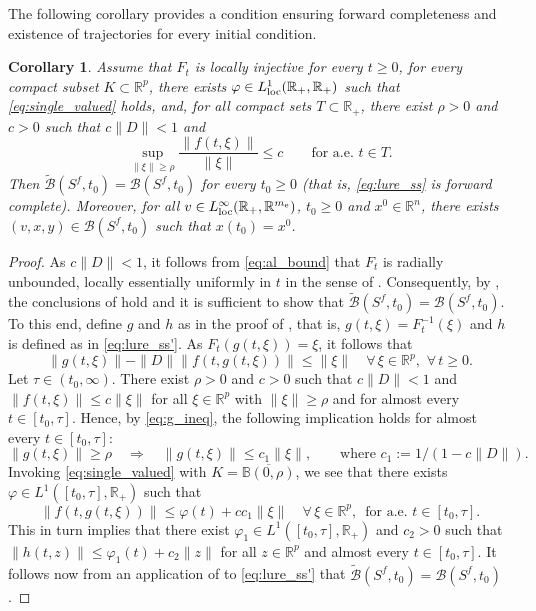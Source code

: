 \documentclass[a4paper,11pt]{article}
\newcommand{\B}{\mathbb B}
\newcommand{\R}{\mathbb R}
\newcommand{\sB}{{\mathcal B}}
\numberwithin{equation}{section}
\numberwithin{figure}{section}
\numberwithin{table}{section}
\newtheorem{corollary}[theorem]{Corollary}
\begin{document}
The following corollary provides a condition ensuring forward completeness and existence
of trajectories for every initial condition.
%
\begin{corollary}\label{cor:single_valued}
Assume that $F_t$ is locally injective for every $t\geq 0$, for every compact subset $K\subset\R^p$, there exists $\varphi\in L^1_{\rm loc}(\R_+,\R_+)$ such that \eqref{eq:single_valued} holds, and,
for all compact sets $T\subset\R_+$, there exist $\rho>0$ and $c>0$ such that $c\|D\|<1$ and
\begin{equation}\label{eq:al_bound}
\sup_{\|\xi\|\geq\rho}\frac{\|f(t,\xi)\|}{\|\xi\|}\leq c\qquad\mbox{for a.e. $t\in T$}.
\end{equation}
Then $\tilde\sB(S^f,t_0)=\sB(S^f,t_0)$ for every $t_0\geq 0$ {\rm (}that is, \eqref{eq:lure_ss} is forward complete{\rm )}. Moreover, for all $v\in L^\infty_{\rm loc}(\R_+,\R^{m_{\rm e}})$, $t_0\geq 0$ and $x^0\in\R^n$, there exists $(v,x,y)\in\sB(S^f,t_0)$ such that $x(t_0)=x^0$.
\end{corollary}
%
\begin{proof} As $c\|D\|<1$, it follows from \eqref{eq:al_bound} that $F_t$ is radially unbounded, locally essentially uniformly in $t$ in the sense of . Consequently, by , the conclusions of  hold and it is sufficient to show that $\tilde\sB(S^f,t_0)=\sB(S^f,t_0)$. To this end, define $g$ and $h$ as in
the proof of , that is, $g(t,\xi)=F_t^{-1}(\xi)$ and $h$ is defined as in \eqref{eq:lure_ss'}. As $F_t(g(t,\xi))=\xi$, it follows that
\begin{equation}\label{eq:g_ineq}
\|g(t,\xi)\|-\|D\|\|f(t,g(t,\xi))\|\leq\|\xi\|\quad\forall\,\xi\in\R^p,\,\,\forall\,t\geq 0.
\end{equation}
Let $\tau\in(t_0,\infty)$. There exist $\rho>0$ and $c>0$ such that $c\|D\|<1$ and
$\|f(t,\xi)\|\leq c\|\xi\|$ for all $\xi\in\R^p$ with $\|\xi\|\geq\rho$
and for almost every $t\in [t_0,\tau]$. Hence, by \eqref{eq:g_ineq}, the following implication
holds for almost every $t\in[t_0,\tau]$:
\[
\|g(t,\xi)\|\geq\rho\quad\Longrightarrow\quad\|g(t,\xi)\|\leq c_1\|\xi\|,\qquad
\mbox{where $c_1:=1/(1-c\|D\|)$}.
\]
Invoking \eqref{eq:single_valued} with $K=\overline{\B(0,\rho)}$, we see that there exists $\varphi\in L^1([t_0,\tau],\R_+)$ such that
\[
\|f(t,g(t,\xi))\|\leq\varphi(t)+cc_1\|\xi\|\quad\forall\,\xi\in\R^p,\,\,\,
\mbox{for a.e. $t\in[t_0,\tau]$.}
\]
This in turn implies that there exist $\varphi_1\in L^1([t_0,\tau],\R_+)$ and $c_2>0$ such that
$\|h(t,z)\|\leq\varphi_1(t)+c_2\|z\|$ for all $z\in\R^p$ and almost every $t\in [t_0,\tau]$.
It follows now from an application of \cite[Proposition 2.1.19]{hp05} to \eqref{eq:lure_ss'}
that $\tilde\sB(S^f,t_0)=\sB(S^f,t_0)$.
\end{proof}
\end{document}
